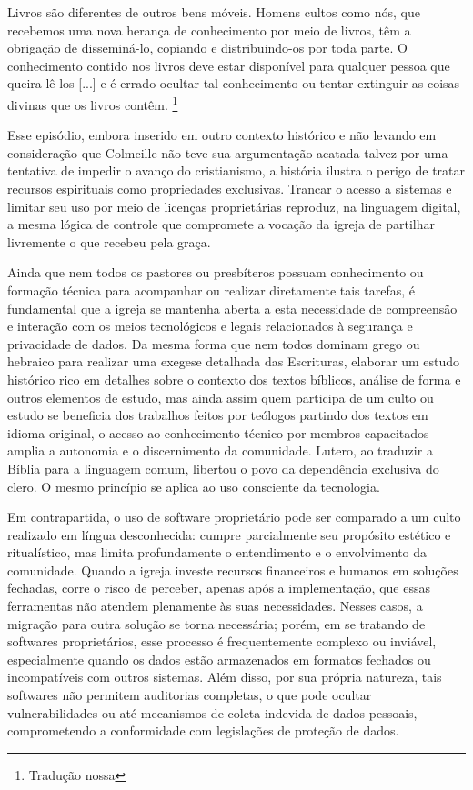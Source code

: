 \begin{citacao}
    Livros são diferentes de outros bens móveis. Homens cultos como nós, que recebemos uma nova herança de conhecimento por meio de livros, têm a obrigação de disseminá-lo, copiando e distribuindo-os por toda parte. O conhecimento contido nos livros deve estar disponível para qualquer pessoa que queira lê-los [...] e é errado ocultar tal conhecimento ou tentar extinguir as coisas divinas que os livros contêm. \cite[p.~40-42]{owens_dorean_2021}\footnote{Tradução nossa}
\end{citacao}

Esse episódio, embora inserido em outro contexto histórico e não levando em consideração que Colmcille não teve sua argumentação acatada talvez por uma tentativa de impedir o avanço do cristianismo, a história ilustra o perigo de tratar recursos espirituais como propriedades exclusivas. Trancar o acesso a sistemas e limitar seu uso por meio de licenças proprietárias reproduz, na linguagem digital, a mesma lógica de controle que compromete a vocação da igreja de partilhar livremente o que recebeu pela graça.

Ainda que nem todos os pastores ou presbíteros possuam conhecimento ou formação técnica para acompanhar ou realizar diretamente tais tarefas, é fundamental que a igreja se mantenha aberta a esta necessidade de compreensão e interação com os meios tecnológicos e legais relacionados à segurança e privacidade de dados. Da mesma forma que nem todos dominam grego ou hebraico para realizar uma exegese detalhada das Escrituras, elaborar um estudo histórico rico em detalhes sobre o contexto dos textos bíblicos, análise de forma e outros elementos de estudo, mas ainda assim quem participa de um culto ou estudo se beneficia dos trabalhos feitos por teólogos partindo dos textos em idioma original, o acesso ao conhecimento técnico por membros capacitados amplia a autonomia e o discernimento da comunidade. Lutero, ao traduzir a Bíblia para a linguagem comum, libertou o povo da dependência exclusiva do clero. O mesmo princípio se aplica ao uso consciente da tecnologia.

Em contrapartida, o uso de software proprietário pode ser comparado a um culto realizado em língua desconhecida: cumpre parcialmente seu propósito estético e ritualístico, mas limita profundamente o entendimento e o envolvimento da comunidade. Quando a igreja investe recursos financeiros e humanos em soluções fechadas, corre o risco de perceber, apenas após a implementação, que essas ferramentas não atendem plenamente às suas necessidades. Nesses casos, a migração para outra solução se torna necessária; porém, em se tratando de softwares proprietários, esse processo é frequentemente complexo ou inviável, especialmente quando os dados estão armazenados em formatos fechados ou incompatíveis com outros sistemas. Além disso, por sua própria natureza, tais softwares não permitem auditorias completas, o que pode ocultar vulnerabilidades ou até mecanismos de coleta indevida de dados pessoais, comprometendo a conformidade com legislações de proteção de dados.

